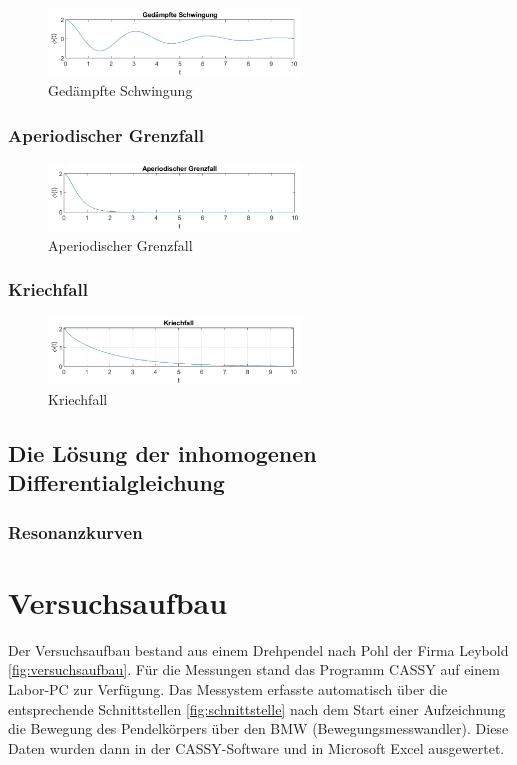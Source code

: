 \documentclass{article}
\begin{document}
\begin{figure}[H]
    \centering
    \includegraphics[width=0.6\textwidth]{bilder/schwingung_gedampft.png}
    \caption{Gedämpfte Schwingung}
    \label{fig:schw_ged}
\end{figure}

\subsubsection{Aperiodischer Grenzfall}

\begin{figure}[H]
    \centering
    \includegraphics[width=0.6\textwidth]{bilder/aperiodischer_grenzfall.png}
    \caption{Aperiodischer Grenzfall}
    \label{fig:aperiod}
\end{figure}

\subsubsection{Kriechfall}

\begin{figure}[H]
    \centering
    \includegraphics[width=0.6\textwidth]{bilder/kriechfall.png}
    \caption{Kriechfall}
    \label{fig:kriech}
\end{figure}

\subsection{Die Lösung der inhomogenen Differentialgleichung}
\subsubsection{Resonanzkurven}

\section{Versuchsaufbau}
Der Versuchsaufbau bestand aus einem Drehpendel nach Pohl der Firma Leybold \ref{fig:versuchsaufbau}.
Für die Messungen stand das Programm CASSY auf einem Labor-PC zur Verfügung.
Das Messystem erfasste automatisch über die entsprechende Schnittstellen \ref{fig:schnittstelle}
nach dem Start einer Aufzeichnung die Bewegung des Pendelkörpers
über den BMW (Bewegungsmesswandler). Diese Daten wurden dann in der CASSY-Software
und in Microsoft Excel ausgewertet.
\end{document}
